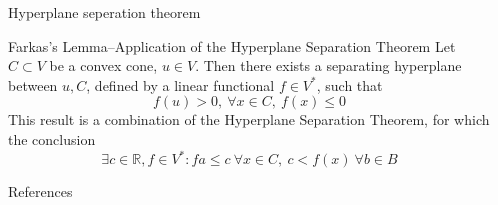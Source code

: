 \documentclass[final]{beamer}
\newlength{\sepwidth}
\newlength{\colwidth}
\newcommand{\separatorcolumn}{\begin{column}{\sepwidth}\end{column}}
\begin{document}
\begin{frame}[fragile]
\begin{columns}[t]
\begin{column}{\colwidth}
\begin{block}{Hyperplane seperation theorem}
            \begin{alertblock}{Farkas's Lemma--Application of the Hyperplane Separation Theorem}
              Let $C \subset V$ be a convex cone, $u\in V$. Then there exists a separating hyperplane between $u, C$, defined by a linear functional $f \in V^*$, such that \begin{equation}
              f(u)> 0, \ \forall x\in C, \ f(x) \le 0
              \end{equation} This result is  a combination of the Hyperplane Separation Theorem, for which the conclusion \begin{equation}
                \exists c\in \mathbb{R}, f \in V^*: fa \le c\ \forall x\in C, \ c < f(x)\ \forall b\in B
              \end{equation}
           
            \end{alertblock}
        \end{block}
        \begin{block}{References}
        \nocite{liunotes}
        \begin{bibdiv}
        \begin{biblist}
        \end{biblist}
        \end{bibdiv}
        \end{block}
\end{column}

\separatorcolumn
\end{columns}
\end{frame}
\end{document}
